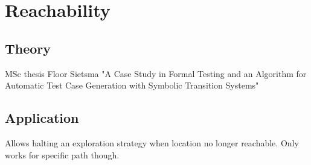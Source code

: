 \section{Reachability}

\subsection{Theory}
MSc thesis Floor Sietsma "A Case Study in Formal Testing and an Algorithm for Automatic Test Case Generation with Symbolic Transition Systems"

\subsection{Application}
Allows halting an exploration strategy when location no longer reachable. Only works for specific path though.
